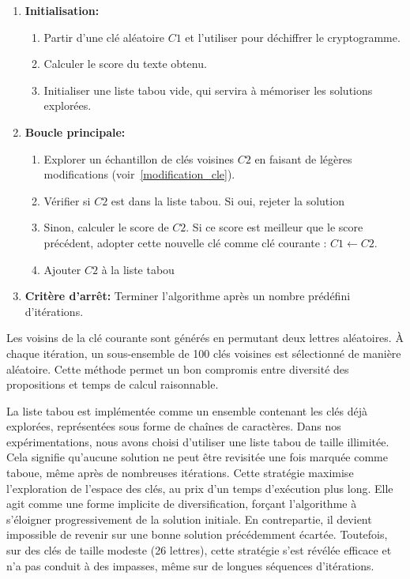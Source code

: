 \documentclass[a4paper]{article}
\begin{document}
\begin{enumerate}
    \item \textbf{Initialisation:}
    \begin{enumerate}
        \item Partir d'une clé aléatoire $C1$ et l'utiliser pour déchiffrer le cryptogramme.
        \item Calculer le score du texte obtenu.
        \item Initialiser une liste tabou vide, qui servira à mémoriser les solutions explorées.
    \end{enumerate}
    \item \textbf{Boucle principale:}
    \begin{enumerate}[label= (\alph*)]
        \item Explorer un échantillon de clés voisines $C2$ en faisant de légères modifications (voir~\ref{modification_cle}).
        \item Vérifier si $C2$ est dans la liste tabou. Si oui, rejeter la solution
        \item Sinon, calculer le score de $C2$. Si ce score est meilleur que le score précédent, adopter cette nouvelle clé comme clé courante : $C1 \leftarrow C2$.
        \item Ajouter $C2$ à la liste tabou 
    \end{enumerate}
    \item \textbf{Critère d'arrêt:} Terminer l'algorithme après un nombre prédéfini d'itérations.
\end{enumerate}

Les voisins de la clé courante sont générés en permutant deux lettres aléatoires. À chaque itération, un sous-ensemble de 100 clés voisines est sélectionné de manière aléatoire. Cette méthode permet un bon compromis entre diversité des propositions et temps de calcul raisonnable.

\vspace{0.5em}

La liste tabou est implémentée comme un ensemble contenant les clés déjà explorées, représentées sous forme de chaînes de caractères. Dans nos expérimentations, nous avons choisi d’utiliser une liste tabou de taille illimitée. Cela signifie qu’aucune solution ne peut être revisitée une fois marquée comme taboue, même après de nombreuses itérations.
Cette stratégie maximise l’exploration de l’espace des clés, au prix d’un temps d’exécution plus long. Elle agit comme une forme implicite de diversification, forçant l’algorithme à s’éloigner progressivement de la solution initiale. En contrepartie, il devient impossible de revenir sur une bonne solution précédemment écartée. Toutefois, sur des clés de taille modeste (26 lettres), cette stratégie s’est révélée efficace et n’a pas conduit à des impasses, même sur de longues séquences d’itérations.
\end{document}
